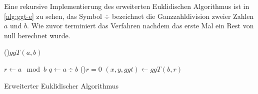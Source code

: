 \noindent
Eine rekursive Implementierung des erweiterten Euklidischen Algorithmus ist in
\autoref{alg:ggt-e} zu sehen, das Symbol $\div$ bezeichnet die Ganzzahldivision
zweier Zahlen $a$ und $b$.
Wie zuvor terminiert das Verfahren nachdem das erste
Mal ein Rest von null berechnet wurde.
\begin{singlespace}
  \begin{algorithm}
    \DontPrintSemicolon
    \BlankLine
    \Fn(){$ggT(a,b)$}{
      $r \leftarrow a \mod{b}$\;
      $q \leftarrow a \div b$\;
      \If(){$r = 0$}{
      }
      $(x,y,ggt) \leftarrow ggT(b,r)$\;

    }
    \caption{Erweiterter Euklidischer Algorithmus}
    \label{alg:ggt-e}
  \end{algorithm}
\end{singlespace}
